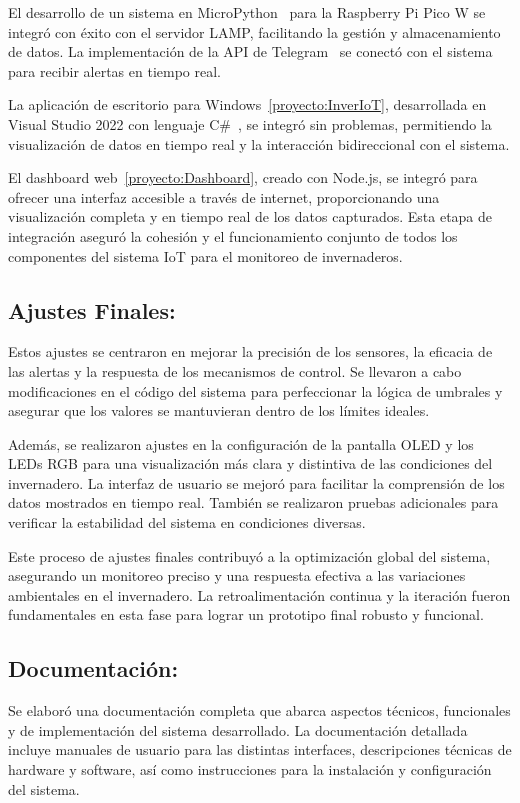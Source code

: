 El desarrollo de un sistema en MicroPython~\cite{wiki:micropython} para la Raspberry Pi Pico W se integró con éxito con el servidor LAMP, facilitando la gestión y almacenamiento de datos. La implementación de la API de Telegram~\cite{misc:Telegram_api} se conectó con el sistema para recibir alertas en tiempo real.

La aplicación de escritorio para Windows~\ref{proyecto:InverIoT}, desarrollada en Visual Studio 2022 con lenguaje C\#~\cite{manual:CSharp}, se integró sin problemas, permitiendo la visualización de datos en tiempo real y la interacción bidireccional con el sistema.

El dashboard web~\ref{proyecto:Dashboard}, creado con Node.js, se integró para ofrecer una interfaz accesible a través de internet, proporcionando una visualización completa y en tiempo real de los datos capturados. Esta etapa de integración aseguró la cohesión y el funcionamiento conjunto de todos los componentes del sistema IoT para el monitoreo de invernaderos.

\subsection{Ajustes Finales:}
Estos ajustes se centraron en mejorar la precisión de los sensores, la eficacia de las alertas y la respuesta de los mecanismos de control. Se llevaron a cabo modificaciones en el código del sistema para perfeccionar la lógica de umbrales y asegurar que los valores se mantuvieran dentro de los límites ideales.

Además, se realizaron ajustes en la configuración de la pantalla OLED y los LEDs RGB para una visualización más clara y distintiva de las condiciones del invernadero. La interfaz de usuario se mejoró para facilitar la comprensión de los datos mostrados en tiempo real. También se realizaron pruebas adicionales para verificar la estabilidad del sistema en condiciones diversas.

Este proceso de ajustes finales contribuyó a la optimización global del sistema, asegurando un monitoreo preciso y una respuesta efectiva a las variaciones ambientales en el invernadero. La retroalimentación continua y la iteración fueron fundamentales en esta fase para lograr un prototipo final robusto y funcional.

\subsection{Documentación:}
Se elaboró una documentación completa que abarca aspectos técnicos, funcionales y de implementación del sistema desarrollado. La documentación detallada incluye manuales de usuario para las distintas interfaces, descripciones técnicas de hardware y software, así como instrucciones para la instalación y configuración del sistema.

